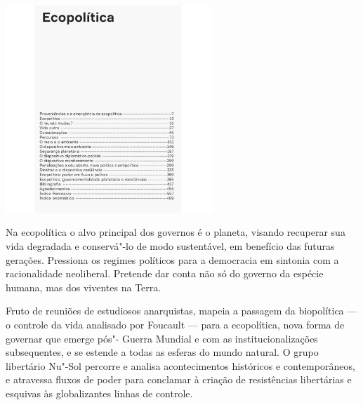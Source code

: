 \begin{center}
\hspace*{-3.5cm}
\hspace*{3cm}\includegraphics[width=78mm]{./grid/passetti.jpeg}
\end{center}

\hspace*{-7cm}\hrulefill\hspace*{-7cm}

\medskip

\noindent{}Na ecopolítica o alvo principal dos governos é o planeta, visando recuperar sua vida degradada e conservá"-lo de modo sustentável, em benefício das futuras gerações. Pressiona os regimes políticos para a democracia em sintonia com a racionalidade neoliberal. Pretende dar conta não só do governo da espécie humana, mas dos viventes na Terra.

Fruto de reuniões de estudiosos anarquistas, {} mapeia a passagem da biopolítica --- o controle da vida analisado por Foucault --- para a ecopolítica, nova forma de governar que emerge pós"- Guerra Mundial e com as institucionalizações subsequentes, e se estende a todas as esferas do mundo natural. O grupo libertário Nu"-Sol percorre e analisa acontecimentos históricos e contemporâneos, e atravessa fluxos de poder para conclamar à criação de resistências libertárias e esquivas às globalizantes linhas de controle.

\vfill

\hspace*{-.4cm}\begin{minipage}[c]{.5\linewidth}
\small{
{}}
\end{minipage}


